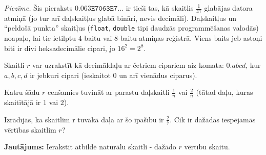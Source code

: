\documentclass[a4paper,12pt]{article}
\newcommand\answer[1]{}
\begin{document}
\begin{problem}
{{\em Piezīme.} Šis pieraksts $\mathtt{0.063E7063E7}\ldots$ ir tieši tas, kā skaitlis $\frac{1}{41}$ glabājas datora atmiņā 
(jo tur arī daļskaitļus glabā bināri, nevis decimāli). 
Daļskaitļus un ``peldošā punkta'' skaitļus ({\tt float}, {\tt double} tipi daudzās programmēšanas valodās) noapaļo, 
lai tie ietilptu $4$-baitu vai $8$-baitu atmiņas reģistrā. Viens baits jeb astoņi biti ir divi heksadecimālie cipari, jo $16^2 = 2^8$.
}
\end{problem}


\vspace{10pt}
\begin{problem}
Skaitli $r$ var uzrakstīt kā decimāldaļu ar četriem cipariem aiz komata: $0.abcd$, kur $a,b,c,d$ ir jebkuri cipari (ieskaitot $0$ un arī vienādus ciparus).

Katru šādu $r$ cenšamies tuvināt ar parastu daļskaitli ${\displaystyle \frac{1}{n}}$ vai ${\displaystyle \frac{2}{n}}$ (tātad daļu, kuras skaitītājā ir $1$ vai $2$).

Izrādījās, ka skaitlim r tuvākā daļa ar šo īpašību ir $\frac{2}{7}$. Cik ir dažādas iespējamās vērtības skaitlim $r$?

{\bf Jautājums:} Ierakstīt atbildē naturālu skaitli - dažādo $r$ vērtību skaitu.
\answer{

{\bf Atbilde.} $\mathtt{417}$\\
\textcolor{teal}{\bf Daļēja atbilde} $\mathtt{416}$.

Ievērosim, ka $\frac{1}{4} < \frac{2}{7} < \frac{1}{3}$. Citi daļskaitļi $1/n$ vai $2/n$ neparādās intervālos $[1/4;2/7]$ vai $[2/7;1/3]$.
Aprēķināsim aritmētiskos vidējos starp abu intervālu galapunktiem: 
\[ \left\{ \begin{array}{l} \frac{1/4 + 2/7}{2} \approx 0.267857\\
\frac{2/7 + 1/3}{2} \approx 0.309524\\
\end{array} \right. \]
Tātad vismazākā četrciparu decimāldaļa, kas apaļojas uz $2/7$ būs $0.2679$, bet pati lielākā būs $0.3095$.
Pavisam šādu daļu būs $(3095 - 2679) + 1 = 417$.

{\em Piezīme.} Ja aizmirst beigās pieskaitīt $1$ (abi galapunkti $[0.2679; 0.3095]$ ieskaitīti!), tad daļēji pareiza atbilde.
}
\end{problem}
\end{document}
